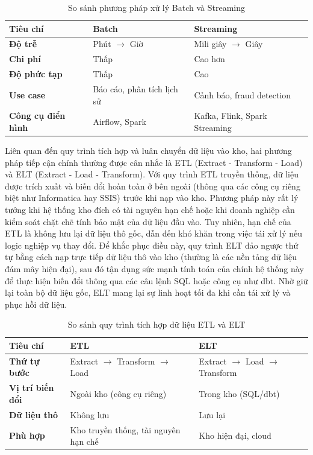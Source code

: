 \begin{table}[H]
    \centering
    \renewcommand{\arraystretch}{1.3}
    \begin{tabular}{|p{3.5cm}|p{5cm}|p{5.5cm}|}
        \hline
        \textbf{Tiêu chí} & \textbf{Batch} & \textbf{Streaming} \\ \hline
        \textbf{Độ trễ} & Phút $\rightarrow$ Giờ & Mili giây $\rightarrow$ Giây \\ \hline
        \textbf{Chi phí} & Thấp & Cao hơn \\ \hline
        \textbf{Độ phức tạp} & Thấp & Cao \\ \hline
        \textbf{Use case} & Báo cáo, phân tích lịch sử & Cảnh báo, fraud detection \\ \hline
        \textbf{Công cụ điển hình} & Airflow, Spark & Kafka, Flink, Spark Streaming \\ \hline
    \end{tabular}
    \caption{So sánh phương pháp xử lý Batch và Streaming}
\end{table}

Liên quan đến quy trình tích hợp và luân chuyển dữ liệu vào kho, hai phương pháp tiếp cận chính thường được cân nhắc là ETL (Extract - Transform - Load) và ELT (Extract - Load - Transform). Với quy trình ETL truyền thống, dữ liệu được trích xuất và biến đổi hoàn toàn ở bên ngoài (thông qua các công cụ riêng biệt như Informatica hay SSIS) trước khi nạp vào kho. Phương pháp này rất lý tưởng khi hệ thống kho đích có tài nguyên hạn chế hoặc khi doanh nghiệp cần kiểm soát chặt chẽ tính bảo mật của dữ liệu đầu vào. Tuy nhiên, hạn chế của ETL là không lưu lại dữ liệu thô gốc, dẫn đến khó khăn trong việc tái xử lý nếu logic nghiệp vụ thay đổi. Để khắc phục điều này, quy trình ELT đảo ngược thứ tự bằng cách nạp trực tiếp dữ liệu thô vào kho (thường là các nền tảng dữ liệu đám mây hiện đại), sau đó tận dụng sức mạnh tính toán của chính hệ thống này để thực hiện biến đổi thông qua các câu lệnh SQL hoặc công cụ như dbt. Nhờ giữ lại toàn bộ dữ liệu gốc, ELT mang lại sự linh hoạt tối đa khi cần tái xử lý và phục hồi dữ liệu.

\begin{table}[H]
    \centering
    \renewcommand{\arraystretch}{1.3}
    \begin{tabular}{|p{3cm}|p{5cm}|p{6cm}|}
        \hline
        \textbf{Tiêu chí} & \textbf{ETL} & \textbf{ELT} \\ \hline
        \textbf{Thứ tự bước} & Extract $\rightarrow$ Transform $\rightarrow$ Load & Extract $\rightarrow$ Load $\rightarrow$ Transform \\ \hline
        \textbf{Vị trí biến đổi} & Ngoài kho (công cụ riêng) & Trong kho (SQL/dbt) \\ \hline
        \textbf{Dữ liệu thô} & Không lưu & Lưu lại \\ \hline
        \textbf{Phù hợp} & Kho truyền thống, tài nguyên hạn chế & Kho hiện đại, cloud \\ \hline
    \end{tabular}
    \caption{So sánh quy trình tích hợp dữ liệu ETL và ELT}
\end{table}


